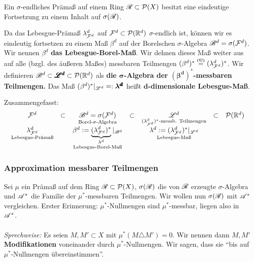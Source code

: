 \begin{korollar}
\begin{mdframed}
Ein $\sigma$-endliches Prämaß auf einem Ring $\RR \subset \PP(X)$ besitzt eine eindeutige Fortsetzung zu einem Inhalt auf $\sigma(\RR)$.
\end{mdframed}
\end{korollar}

\begin{definition}
\begin{mdframed}
Da das Lebesgue-Prämaß $\lambda^d_{\FF^d}$ auf $\FF^d\subset \PP(\R^d)$ $\sigma$-endlich ist, können wir es eindeutig fortsetzen zu einem Maß $\beta^d$ auf der Borelschen $\sigma$-Algebra $\BB^d = \sigma(\FF^d)$. Wir nennen $\beta^d$ \textbf{das Lebesgue-Borel-Maß}. Wir dehnen dieses Maß weiter aus auf alle (bzgl. des äußeren Maßes) messbaren Teilmengen $(\beta^d)^* \overset{\text{\Ueb}}= (\lambda^d_{\FF^d})^*$. Wir definieren $\BB^d \subset \pmb{\LL^d} \subset \PP(\R^d)$ als \textbf{die $\boldsymbol\sigma$-Algebra der $\boldsymbol{(\beta^d)^*}$-messbaren Teilmengen.} Das Maß $(\beta^d)^*|_{\LL^d} =: \boldsymbol{\lambda^{\pmb{d}}}$ heißt \textbf{$\boldsymbol{d}$-dimensionale Lebesgue-Maß}.
\end{mdframed}
\end{definition}

Zusammengefasst:
\begin{equation*}
\begin{array}{ccccccc}
\FF^d	& \subset & 
	\underset{\text{Borel-}\sigma\text{-Algebra}}{\BB^d=\sigma(\FF^d)} & \subset  & \underset{(\lambda^d_{\FF^d})^*\text{-messb. Teilmengen}}{\LL^d}	& \subset & \PP(\R^d) \\ 
\underset{\text{Lebesgue-Prämaß}}{\lambda^d_{\FF^d}} & &
\underset{\text{Lebesgue-Borel-Maß}}{\beta^d := \underbrace{(\lambda^d_{\FF^d})^*}_{\lambda^d}|_{\BB^d}} &&
\underset{\text{Lebesgue-Maß}}{\lambda^d := (\lambda^d_{\FF^d})^*|_{\LL^d}}
\end{array}
\end{equation*}

\subsubsection{Approximation messbarer Teilmengen}
Sei $\mu$ ein Prämaß auf dem Ring $\RR \subset \PP(X)$, $\sigma(\RR)$ die von $\RR$ erzeugte $\sigma$-Algebra und $\AA^*$ die Familie der $\mu^*$-messbaren Teilmengen. Wir wollen nun $\sigma(\RR)$ mit $\AA^*$ vergleichen. Erster Erinnerung: $\mu^*$-Nullmengen sind $\mu^*$-messbar, liegen also in $\AA^*$.\\\\
\textit{Sprechweise:} Es seien $M,M'\subset X$ mit $\mu^*(M \triangle M') = 0$. Wir nennen dann $M, M'$ \textbf{Modifikationen} voneinander durch $\mu^*$-Nullmengen. Wir sagen, dass sie ``bis auf $\mu^*$-Nullmengen übereinstimmen''.

